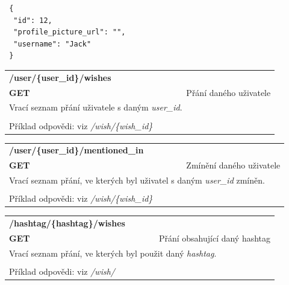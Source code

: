 \documentclass[thesis=B,czech]{FITthesis}[2012/06/26]
\begin{document}
\begin{lstlisting}
 {
  "id": 12,
  "profile_picture_url": "",
  "username": "Jack"
 }
\end{lstlisting} 

\begin{table}[h]
\begin{tabular}{llllr}
\rowcolor[HTML]{EFEFEF}
\large \textbf{/user/\{user\_id\}/wishes}        &         &                 &        & \multicolumn{1}{l}{}                \\
\rowcolor[HTML]{EFEFEF}
\textbf{GET}          &         &                 &        & Přání daného uživatele                        \\
\multicolumn{5}{l}{\parbox[t]{12.8cm}{Vrací seznam přání uživatele s daným \textit{user\_id}. }  } \\  
 & & & & \\
 Příklad odpovědi: viz \textit{/wish/\{wish\_id\}}
\end{tabular}
\end{table}

\begin{table}[h]
\begin{tabular}{llllr}
\rowcolor[HTML]{EFEFEF}
\large \textbf{/user/\{user\_id\}/mentioned\_in}        &         &                 &        & \multicolumn{1}{l}{}                \\
\rowcolor[HTML]{EFEFEF}
\textbf{GET}          &         &                 &        & Zmínění daného uživatele                        \\
\multicolumn{5}{l}{\parbox[t]{12.8cm}{Vrací seznam přání, ve kterých byl uživatel s daným \textit{user\_id} zmíněn. }  } \\  
 & & & & \\
 Příklad odpovědi: viz \textit{/wish/\{wish\_id\}}
\end{tabular}
\end{table}


\begin{table}[h]
\begin{tabular}{llllr}
\rowcolor[HTML]{EFEFEF}
\large \textbf{/hashtag/\{hashtag\}/wishes}        &         &                 &        & \multicolumn{1}{l}{}                \\
\rowcolor[HTML]{EFEFEF}
\textbf{GET}          &         &                 &        & Přání obsahující daný hashtag                       \\
\multicolumn{5}{l}{\parbox[t]{12.8cm}{Vrací seznam přání, ve kterých byl použit daný \textit{hashtag}. }  } \\  
 & & & & \\
 Příklad odpovědi: viz \textit{/wish/}
\end{tabular}
\end{table}
\end{document}

